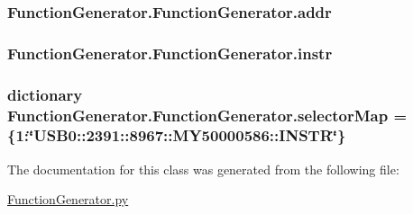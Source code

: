 \subsubsection[{addr}]{\setlength{\rightskip}{0pt plus 5cm}Function\+Generator.\+Function\+Generator.\+addr}\label{class_function_generator_1_1_function_generator_a6232661c93750461489cadd41b721d56}
\hypertarget{class_function_generator_1_1_function_generator_a31f74674e20ebd808c28abf817cafccf}{}
\subsubsection[{instr}]{\setlength{\rightskip}{0pt plus 5cm}Function\+Generator.\+Function\+Generator.\+instr}\label{class_function_generator_1_1_function_generator_a31f74674e20ebd808c28abf817cafccf}
\hypertarget{class_function_generator_1_1_function_generator_af0f7aaea68bd468c28524373f6005d8f}{}
\subsubsection[{selector\+Map}]{\setlength{\rightskip}{0pt plus 5cm}dictionary Function\+Generator.\+Function\+Generator.\+selector\+Map = \{1\+:\char`\"{}U\+S\+B0\+::2391\+::8967\+::\+M\+Y50000586\+::\+I\+N\+S\+T\+R\char`\"{}\}\hspace{0.3cm}{\ttfamily [static]}}\label{class_function_generator_1_1_function_generator_af0f7aaea68bd468c28524373f6005d8f}


The documentation for this class was generated from the following file\+:\begin{DoxyCompactItemize}
\item 
\hyperlink{_function_generator_8py}{Function\+Generator.\+py}\end{DoxyCompactItemize}
